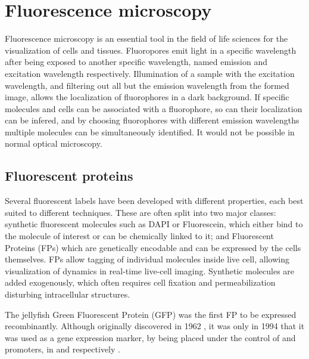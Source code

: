 \section{Fluorescence microscopy}

  Fluorescence microscopy is an essential tool in the field of life
  sciences for the visualization of cells and tissues.
  Fluoropores emit light in a specific wavelength after
  being exposed to another specific wavelength, named
  emission and excitation wavelength respectively.
  Illumination of a sample with the excitation wavelength, and filtering
  out all but the emission wavelength from the formed image, allows
  the localization of fluorophores in a dark background.
  If specific molecules and cells can be associated with a fluorophore,
  so can their localization can be infered, and by choosing fluorophores
  with different emission wavelengths multiple molecules can be
  simultaneously identified.
  It would not be possible in normal optical microscopy.

  \subsection{Fluorescent proteins}
    Several fluorescent labels have been developed with different
    properties, each best suited to different techniques.
    These are often split into two major classes: synthetic fluorescent
    molecules such as DAPI or Fluorescein, which either bind to the molecule of
    interest or can be chemically linked to it; and Fluorescent Proteins (FPs)
    which are genetically encodable and can be expressed by the cells themselves.
    FPs allow tagging of individual molecules inside live cell, allowing
    visualization of dynamics in real-time live-cell imaging.
    Synthetic molecules are added exogenously, which often requires cell
    fixation and permeabilization disturbing intracellular structures.

    The  jellyfish Green Fluorescent Protein (GFP) was
    the first FP to be expressed recombinantly.
    Although originally discovered in 1962 \citep{shimomura1962-gfp-discovery},
    it was only in 1994 that it was used as a gene expression
    marker, by being placed under the control of  and
     promoters, in  and 
    respectively \citep{gfp-first-expression-marker}.

